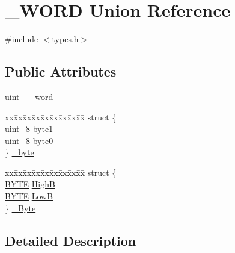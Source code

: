 \hypertarget{union___w_o_r_d}{}\section{\+\_\+\+W\+O\+RD Union Reference}
\label{union___w_o_r_d}


{\ttfamily \#include $<$types.\+h$>$}

\subsection*{Public Attributes}
\begin{DoxyCompactItemize}
\item 
\hyperlink{types_8h_a8ab774e38493b7c7e4d8edfd5004e66b}{uint\+\_} \hyperlink{union___w_o_r_d_abc73d592f7734d8cfde8bb9437dd7344}{\+\_\+word}
\item 
\begin{tabbing}
xx\=xx\=xx\=xx\=xx\=xx\=xx\=xx\=xx\=\kill
struct \{\\
\>\hyperlink{types_8h_ad3209046c23f739a81581c10a4be7d92}{uint\_8} \hyperlink{union___w_o_r_d_abf8dc96d722fc97a68876440d86517d5}{byte1}\\
\>\hyperlink{types_8h_ad3209046c23f739a81581c10a4be7d92}{uint\_8} \hyperlink{union___w_o_r_d_add842631704b01778ecbfebc4dc1a399}{byte0}\\
\} \hyperlink{union___w_o_r_d_a8e49f349faf19cfa02763f3709cd5519}{\_byte}\\

\end{tabbing}\item 
\begin{tabbing}
xx\=xx\=xx\=xx\=xx\=xx\=xx\=xx\=xx\=\kill
struct \{\\
\>\hyperlink{types_8h_ae044ebb2609ed229a46e78b90779d73d}{BYTE} \hyperlink{union___w_o_r_d_ab08070c01735d50dd8b851bb961998f2}{HighB}\\
\>\hyperlink{types_8h_ae044ebb2609ed229a46e78b90779d73d}{BYTE} \hyperlink{union___w_o_r_d_a654368554c33c49ef7db7134f0c8ea41}{LowB}\\
\} \hyperlink{union___w_o_r_d_a025d229429d1dfdd660aed1a1d1a869b}{\_Byte}\\

\end{tabbing}\end{DoxyCompactItemize}


\subsection{Detailed Description}


